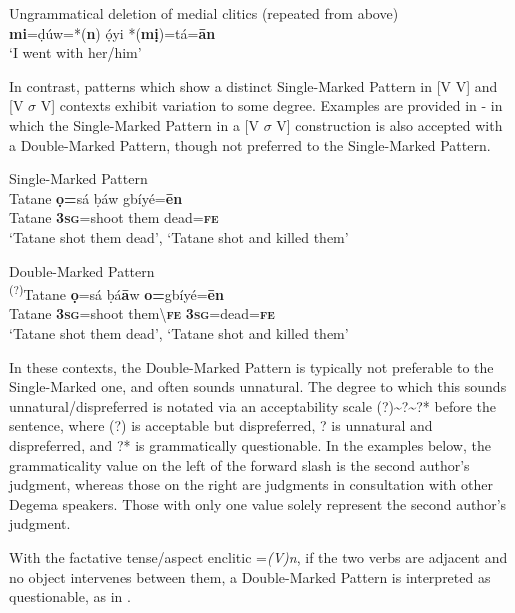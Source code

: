 \documentclass[output=paper]{langsci/langscibook}
\begin{document}
\ea
{Ungrammatical deletion of medial clitics (repeated from  above)}\\
\textbf{mi}=ḍúw=*(\textbf{n})   ọ́yi   *(\textbf{mị})=tá=\textbf{ān}\\
\glt ‘I went with her/him’ \citep[201]{Kari2004}
\z

In contrast, patterns which show a distinct Single-Marked Pattern in [V V] and [V $\sigma $ V] contexts exhibit variation to some degree. Examples are provided in - in which the Single-Marked Pattern in a [V $\sigma $ V] construction is also accepted with a Double-Marked Pattern, though not preferred to the Single-Marked Pattern.

\ea\label{ex:rolle:21}
Single-Marked Pattern\\
\gll    Tatane  \textbf{ọ=}sá    ḅáw   gbíyé=\textbf{ēn}\\
     Tatane  \textbf{3}\textbf{\textsc{sg}}=shoot  them   dead=\textbf{\textsc{fe}}\\
\glt ‘Tatane shot them dead’, ‘Tatane shot and killed them’ 
\z

\ea\label{ex:rolle:22}
 Double-Marked Pattern\\
\gll  \textsuperscript{(?)}Tatane  \textbf{ọ}=sá    ḅá\textbf{ā}w    \textbf{o=}gbíyé=\textbf{ēn}\\
     Tatane  \textbf{3\textsc{sg}}=shoot   them{\textbackslash}\textbf{\textsc{fe}}    \textbf{3\textsc{sg}}=dead=\textbf{\textsc{fe}}\\
\glt ‘Tatane shot them dead’, ‘Tatane shot and killed them’
\z

In these contexts, the Double-Marked Pattern is typically not preferable to the Single-Marked one, and often sounds unnatural. The degree to which this sounds unnatural/dispreferred is notated via an acceptability scale (?){\textasciitilde}?{\textasciitilde}?* before the sentence, where (?) is acceptable but dispreferred, ? is unnatural and dispreferred, and ?* is grammatically questionable. In the examples below, the grammaticality value on the left of the forward slash is the second author’s judgment, whereas those on the right are judgments in consultation with other Degema speakers. Those with only one value solely represent the second author’s judgment.

With the factative tense/aspect enclitic =\textit{(V)n}, if the two verbs are adjacent and no object intervenes between them, a Double-Marked Pattern is interpreted as questionable, as in . 
\end{document}
